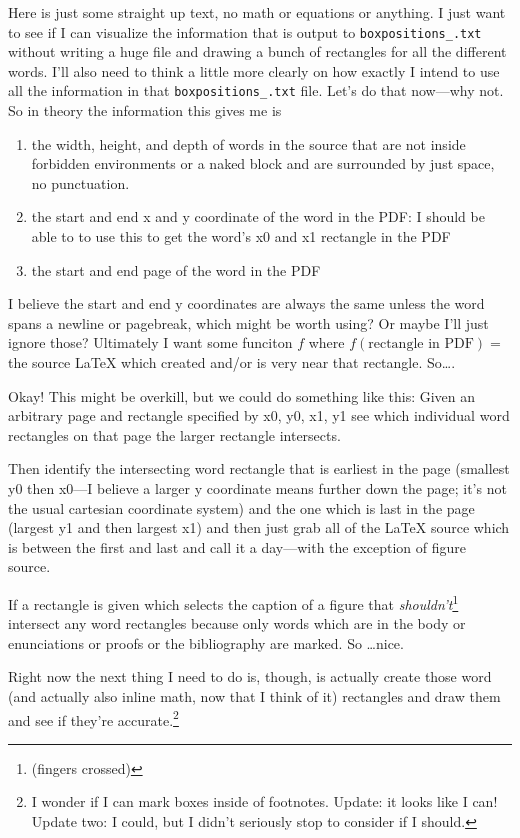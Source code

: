 \documentclass{amsart}
\begin{document}
Here is just some straight up text, no math or equations or anything. I just want to see if I can visualize the information that is output to \texttt{boxpositions\_.txt} without writing a huge file and drawing a bunch of rectangles for all the different words. I'll also need to think a little more clearly on how exactly I intend to use all the information in that {\tt boxpositions\_.txt} file. Let's do that now---why not. So in theory the information this gives me is
\begin{enumerate}
\item the width, height, and depth of words in the source that are not inside forbidden environments or a naked block and are surrounded by just space, no punctuation.
\item the start and end x and y coordinate of the word in the PDF: I should be able to to use this to get the word's x0 and x1 rectangle in the PDF
\item the start and end page of the word in the PDF
\end{enumerate}
I believe the start and end y coordinates are always the same unless the word spans a newline or pagebreak, which might be worth using? Or maybe I'll just ignore those? Ultimately I want some funciton $f$ where $f(\text{rectangle in PDF}) = $ the source \LaTeX{} which created and/or is very near that rectangle. So\dots.

Okay! This might be overkill, but we could do something like this:
Given an arbitrary page and rectangle specified by x0, y0, x1, y1 see which individual word rectangles on that page the larger rectangle intersects.

Then identify the intersecting word rectangle that is earliest in the page (smallest y0 then x0---I believe a larger y coordinate means further down the page; it's not the usual cartesian coordinate system) and the one which is last in the page (largest y1 and then largest x1) and then just grab all of the \LaTeX{} source which is between the first and last and call it a day---with the exception of figure source.

If a rectangle is given which selects the caption of a figure that \textit{shouldn't}\footnote{(fingers crossed)} intersect any word rectangles because only words which are in the body or enunciations or proofs or the bibliography are marked. So \dots nice.

Right now the next thing I need to do is, though, is actually create those word (and actually also inline math, now that I think of it) rectangles and draw them and see if they're accurate.\footnote[9001]{I wonder if I can mark boxes inside of footnotes. Update: it looks like I can! Update two: I could, but I didn't seriously stop to consider if I should.}
\end{document}
